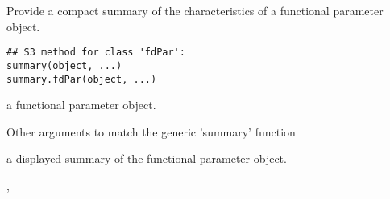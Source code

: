 \begin{Description}\relax
Provide a compact summary of the characteristics of a functional
parameter object.
\end{Description}
\begin{Usage}
\begin{verbatim}
## S3 method for class 'fdPar':
summary(object, ...)
summary.fdPar(object, ...)
\end{verbatim}
\end{Usage}
\begin{Arguments}
\begin{ldescription}
\item[\code{object}] a functional parameter object.

\item[\code{...}] Other arguments to match the generic 'summary' function
\end{ldescription}
\end{Arguments}
\begin{Value}
a displayed summary of the functional parameter object.
\end{Value}
\begin{SeeAlso}\relax
{},
\end{SeeAlso}

